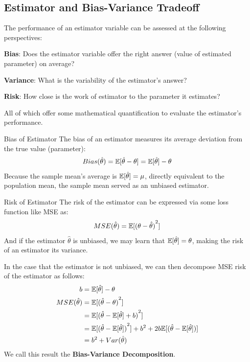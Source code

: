 \subsection{Estimator and Bias-Variance Tradeoff}
The performance of an estimator variable can be assessed at the following perspectives:
\begin{bindenum}
    \item \textbf{Bias}: Does the estimator variable offer the right answer (value of estimated parameter) on average?
    \item \textbf{Variance}: What is the variability of the estimator's answer?
    \item \textbf{Risk}: How close is the work of estimator to the parameter it estimates?
\end{bindenum}
All of which offer some mathematical quantification to evaluate the estimator's performance.
\begin{ln-define}{Bias of Estimator}{}
    The bias of an estimator measures its average deviation from the true value (parameter):
    \[
        Bias(\hat{\theta}) = \mathbb{E}[\hat{\theta} - \theta] = \mathbb{E}[\hat{\theta}] - \theta
    \]
    Because the sample mean's average is $\mathbb{E}[\hat{\theta}] = \mu$, directly equivalent to the population mean, the sample mean served as an unbiased estimator.
\end{ln-define}
\begin{ln-define}{Risk of Estimator}{}
    The risk of the estimator can be expressed via some loss function like MSE as:
    \[
        MSE(\hat{\theta}) = \mathbb{E}[{(\theta - \hat{\theta})}^2]
    \]
    And if the estimator $\hat{\theta}$ is unbiased, we may learn that $\mathbb{E}[\hat{\theta}] = \theta$, making the risk of an estimator its variance.
\end{ln-define}
In the case that the estimator is not unbiased, we can then decompose MSE risk of the estimator as follows:
\begin{align*}
    b &= \mathbb{E}[\hat{\theta}] - \theta \\
    MSE(\hat{\theta}) &= \mathbb{E}[{(\hat{\theta} - \theta)}^2] \\
    &= \mathbb{E}[{(\hat{\theta} - \mathbb{E}[\hat{\theta}] + b)}^2] \\
    &= \mathbb{E}[{(\hat{\theta} - \mathbb{E}[\hat{\theta}])}^2] + b^2 + 2b\mathbb{E}[(\hat{\theta} - \mathbb{E}[\hat{\theta}])] \\
    &= b^2 + Var(\hat{\theta})
\end{align*}
We call this result the \textbf{Bias-Variance Decomposition}.

